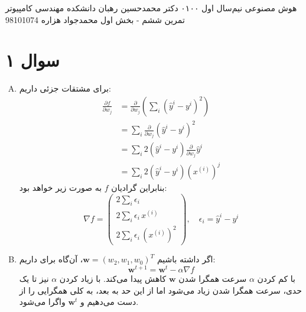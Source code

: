 \documentclass[a4paper, 12pt]{article}
\begin{document}
\handout
{هوش مصنوعی}
{نیم‌سال اول ۰۱\lr{-}۰۰}
{دکتر محمدحسین رهبان}
{دانشکده مهندسی کامپیوتر}
{تمرین ششم - بخش اول}
{محمدجواد هزاره}
{98101074}
\noindent
\\[-6em]
\section*{سوال ۱}
\begin{enumerate}[A)]
	\item
	برای مشتقات جزئی داریم:
	\[
	\begin{aligned}
		\frac{\partial f}{\partial w_j} &= \frac{\partial}{\partial w_j} \left(\sum_i (\hat{y}^i-y^i)^2\right) \\[0.5em]
		&= \sum_i \frac{\partial}{\partial w_j} (\hat{y}^i - y^i)^2\\[0.5em]
		&= \sum_i 2(\hat{y}^i - y^i) \frac{\partial}{\partial w_j} \hat{y}^i \\[0.5em]
		&= \sum_i 2(\hat{y}^i - y^i) (x^{(i)})^j
	\end{aligned}
	\]
	بنابراین گرادیان $f$ به صورت زیر خواهد بود:
	\[
	\nabla f = \left(\begin{array}{c}
		2\sum_i \epsilon_i \\
		2\sum_i \epsilon_i \, x^{(i)} \\
		2\sum_i \epsilon_i \, (x^{(i)})^2
	\end{array}\right), \quad \epsilon_i = \hat{y}^i - y^i
	\]
	\item
	اگر داشته باشیم
	$\bm{w} = (w_2, w_1, w_0)^T$،
	آن‌گاه برای  داریم:
	\[
	\bm{w}^{t+1} = \bm{w}^t - \alpha \nabla f
	\]
	با کم کردن $\alpha$ سرعت همگرا شدن $\bm{w}$ کاهش پیدا می‌کند. با زیاد کردن $\alpha$ نیز تا یک حدی، سرعت همگرا شدن زیاد می‌شود اما از این حد به بعد، به کلی همگرایی را از دست می‌دهیم و 
	$\bm{w}^t$
	واگرا می‌شود.
\end{enumerate}
	
\end{document}
